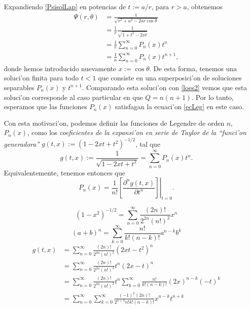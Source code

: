 Expandiendo \eqref{PsisolLap} en potencias de $t:=a/r$, para $r>a$, obtenemos
\begin{align}
\Psi(r,\theta) &= \frac{1}{\sqrt{r^2+a^2-2ar\cos\theta}} \\
&= \frac{1}{r}\frac{1}{\sqrt{1+t^2-2xt}} \\
&= \frac{1}{r}\sum_{n=0}^\infty P_n(x)t^n \\
&= \frac{1}{a}\sum_{n=0}^\infty P_n(x)t^{n+1},
\end{align}
donde hemos introducido nuevamente $x:=\cos\theta$. De esta forma, tenemos una soluci'on finita para todo $t<1$ que consiste en una superposici'on de soluciones separables $P_n(x)$ y $t^{n+1}$. Comparando esta soluci'on con \eqref{loes2} vemos que esta soluci'on corresponde al caso particular en que $Q=n(n+1)$. Por lo tanto, esperamos que las funciones $P_n(x)$ satisfagan la ecuaci'on \eqref{ecLeg} en este caso.  

Con esta motivaci'on, podemos definir las funciones de Legendre de orden $n$, $P_n(x)$, como los \textit{coeficientes de la expansi'on en serie de Taylor de la ``funci'on generadora''}  $g(t,x):=(1-2xt+t^2)^{-1/2}$, tal que
\begin{equation}
g(t,x):=\frac{1}{\sqrt{1-2xt+t^2}}=\sum_{n=0}^{\infty}P_{n}(x)t^{n}.
\end{equation}
Equivalentemente, tenemos entonces que
\begin{equation}
P_n(x)=\frac{1}{n!}\left.\left[\frac{\partial^ng(t,x)}{\partial t^n}\right]\right|_{t=0}.
\end{equation}

\begin{equation}
(1-x^2)^{-1/2}=\sum_{n=0}^\infty\frac{(2n)!}{2^{2n}(n!)^2}x^n
\end{equation}
\begin{equation}
(a+b)^n=\sum_{k=0}^\infty\frac{n!}{k!(n-k)!}a^{n-k}b^k
\end{equation}
\begin{align}
g(t,x) &= \sum_{n=0}^\infty\frac{(2n)!}{2^{2n}(n!)^2}(2xt-t^2)^n \\
&= \sum_{n=0}^\infty\frac{(2n)!}{2^{2n}(n!)^2}t^n(2x-t)^n \\
&= \sum_{n=0}^\infty\frac{(2n)!}{2^{2n}(n!)^2}t^n \sum_{k=0}^\infty\frac{n!}{k!(n-k)!}(2x)^{n-k}(-t)^k\\
&= \sum_{n=0}^\infty\sum_{k=0}^\infty\frac{(-1)^k(2n)!}{2^{n+k}n!k!(n-k)!}x^{n-k}t^{n+k}\\
\end{align}

